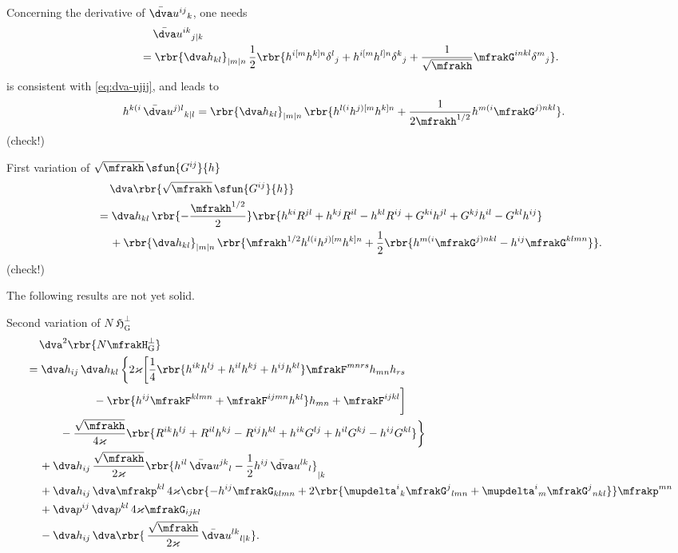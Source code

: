 \documentclass[a4paper,11pt]{article}
\begin{document}
Concerning the derivative of $\bar{\dva}u^{ij}{}_k$, one needs
\begin{align}
&\quad\,
\bar{\dva}u^{ik}{}_{j|k} 
\nonumber \\
&=
\rbr{\dva h_{kl}}_{|m|n}\,
\frac{1}{2} \rbr{h^{i[m} h^{k]n} \delta^l{}_j + h^{i[m}h^{l]n} \delta^k{}_j
+ \frac{1}{\sqrt{\mfrakh}} \mfrakG^{inkl} \delta^m{}_j}.
\label{eq:dva-uikj|k}
\end{align}
 is consistent with \cref{eq:dva-ujij}, and leads to
\begin{align}
h^{k(i}\,\bar{\dva}u^{j)l}{}_{k|l} &=
\rbr{\dva h_{kl}}_{|m|n}\,\rbr{h^{l(i}h^{j)[m}h^{k]n}
+\frac{1}{2\mfrakh^{1/2}} h^{m(i}\mfrakG^{j)nkl}}.
\label{eq:hki-dva-ujlk|l}
\end{align}
(check!)

First variation of $\sqrt{\mfrakh}\,\sfun{G^{ij}}{h}$
\begin{align}
&\quad\,
\dva\rbr{\sqrt{\mfrakh}\,\sfun{G^{ij}}{h}}
\nonumber \\
&=\dva h_{kl}\,\rbr{-\frac{\mfrakh^{1/2}}{2}}
\rbr{h^{ki}R^{jl}+h^{kj}R^{il}-h^{kl}R^{ij}
+G^{ki}h^{jl}+G^{kj}h^{il}-G^{kl}h^{ij}}
\nonumber \\
&\quad\,
+\rbr{\dva h_{kl}}_{|m|n}\,
\rbr{\mfrakh^{1/2}h^{l(i}h^{j)[m}h^{k]n} + \frac{1}{2}\rbr{
h^{m(i}\mfrakG^{j)nkl} - h^{ij}\mfrakG^{klmn}}}.
\end{align}
(check!)

The following results are not yet solid.

Second variation of $N \mfrakH_\text{G}^\perp$
\begin{align}
&\quad\,
\dva^2\rbr{N \mfrakH_\text{G}^\perp}
\nonumber \\
&= \dva h_{ij}\,\dva h_{kl}\,\bigg\{ 2\varkappa\bigg[
\frac{1}{4}\rbr{h^{ik}h^{lj}+h^{il}h^{kj}+h^{ij}h^{kl}} \mfrakF^{mnrs} 
h_{mn} h_{rs}
\nonumber \\
&\qquad\qquad\qquad
-\rbr{h^{ij}\mfrakF^{klmn}+\mfrakF^{ijmn}h^{kl}}h_{mn}
+\mfrakF^{ijkl} \bigg]
\nonumber \\
&\qquad\quad
-\frac{\sqrt{\mfrakh}}{4\varkappa}\rbr{
R^{ik}h^{lj}+R^{il}h^{kj}-R^{ij}h^{kl}+h^{ik}G^{lj}+h^{il}G^{kj}-h^{ij}G^{kl}}
\bigg\}
\nonumber \\
&\quad\,
+\dva h_{ij}\,\frac{\sqrt{\mfrakh}}{2\varkappa}
\rbr{h^{il}\,\bar{\dva}u^{jk}{}_{l}
- \frac{1}{2}h^{ij}\,\bar{\dva}u^{lk}{}_{l}}_{|k} 
\nonumber \\
&\quad\,
+\dva h_{ij}\,\dva \mfrakp^{kl}\,4\varkappa
\cbr{-h^{ij}\mfrakG_{klmn}+2\rbr{\mupdelta^i{}_k\mfrakG^{j}{}_{lmn} 
+\mupdelta^i{}_m\mfrakG^{j}{}_{nkl}} } \mfrakp^{mn}
\nonumber \\
&\quad\,
+\dva p^{ij}\,\dva p^{kl}\,4\varkappa \mfrakG_{ijkl}
\nonumber \\
&\quad\,
-\dva h_{ij}\,
\dva\rbr{\,\frac{\sqrt{\mfrakh}}{2\varkappa}\,\bar{\dva}u^{lk}{}_{l|k}}.
\end{align}
\end{document}

